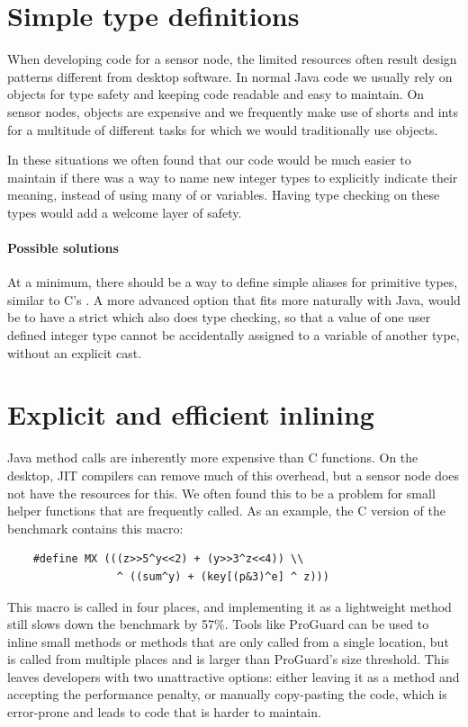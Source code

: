 \section{Simple type definitions}
\label{sec-typedef}
When developing code for a sensor node, the limited resources often result design patterns different from desktop software. In normal Java code we usually rely on objects for type safety and keeping code readable and easy to maintain. On sensor nodes, objects are expensive and we frequently make use of shorts and ints for a multitude of different tasks for which we would traditionally use objects.

In these situations we often found that our code would be much easier to maintain if there was a way to name new integer types to explicitly indicate their meaning, instead of using many of  or  variables. Having type checking on these types would add a welcome layer of safety.

\paragraph{Possible solutions}
At a minimum, there should be a way to define simple aliases for primitive types, similar to C's . A more advanced option that fits more naturally with Java, would be to have a strict  which also does type checking, so that a value of one user defined integer type cannot be accidentally assigned to a variable of another type, without an explicit cast.




\section{Explicit and efficient inlining}
\label{sec-inlining}
Java method calls are inherently more expensive than C functions. On the desktop, JIT compilers can remove much of this overhead, but a sensor node does not have the resources for this. We often found this to be a problem for small helper functions that are frequently called. As an example, the C version of the  benchmark contains this macro: 

\begin{verbatim}
    #define MX (((z>>5^y<<2) + (y>>3^z<<4)) \\
                 ^ ((sum^y) + (key[(p&3)^e] ^ z)))
\end{verbatim}

This macro is called in four places, and implementing it as a lightweight method still slows down the benchmark by 57\%. Tools like ProGuard \cite{proguard} can be used to inline small methods or methods that are only called from a single location, but  is called from multiple places and is larger than ProGuard's size threshold. This leaves developers with two unattractive options: either leaving it as a method and accepting the performance penalty, or manually copy-pasting the code, which is error-prone and leads to code that is harder to maintain.

